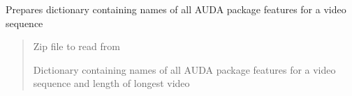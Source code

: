 \documentclass[letterpaper,10pt,english]{sphinxmanual}
\begin{document}

\begin{fulllineitems}
\label{\detokenize{dataset:dataset.features_zip_to_dict}}
\pysigstartsignatures
{}
\pysigstopsignatures
\sphinxAtStartPar
Prepares dictionary containing names of all AUDA package features for a video sequence
\begin{quote}\begin{description}
\sphinxAtStartPar
{} \textendash{} Zip file to read from

\sphinxAtStartPar
Dictionary containing names of all AUDA package features for a video sequence and length of longest video

\end{description}\end{quote}

\end{fulllineitems}

\end{document}
